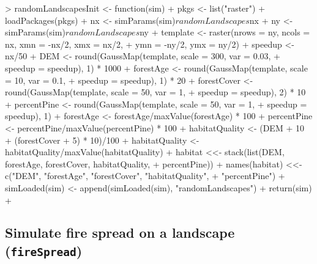 \documentclass{article}
\begin{document}
\begin{Schunk}
\begin{Soutput}
> randomLandscapesInit <- function(sim) {
+     pkgs <- list("raster")
+     loadPackages(pkgs)
+     nx <- simParams(sim)$randomLandscapes$nx
+     ny <- simParams(sim)$randomLandscapes$ny
+     template <- raster(nrows = ny, ncols = nx, xmn = -nx/2, xmx = nx/2, 
+         ymn = -ny/2, ymx = ny/2)
+     speedup <- nx/50
+     DEM <- round(GaussMap(template, scale = 300, var = 0.03, 
+         speedup = speedup), 1) * 1000
+     forestAge <- round(GaussMap(template, scale = 10, var = 0.1, 
+         speedup = speedup), 1) * 20
+     forestCover <- round(GaussMap(template, scale = 50, var = 1, 
+         speedup = speedup), 2) * 10
+     percentPine <- round(GaussMap(template, scale = 50, var = 1, 
+         speedup = speedup), 1)
+     forestAge <- forestAge/maxValue(forestAge) * 100
+     percentPine <- percentPine/maxValue(percentPine) * 100
+     habitatQuality <- (DEM + 10 + (forestCover + 5) * 10)/100
+     habitatQuality <- habitatQuality/maxValue(habitatQuality)
+     habitat <<- stack(list(DEM, forestAge, forestCover, habitatQuality, 
+         percentPine))
+     names(habitat) <<- c("DEM", "forestAge", "forestCover", "habitatQuality", 
+         "percentPine")
+     simLoaded(sim) <- append(simLoaded(sim), "randomLandscapes")
+     return(sim)
+ }
\end{Soutput}
\end{Schunk}

\newpage

\subsection{Simulate fire spread on a landscape (\texttt{fireSpread})}
\end{document}
